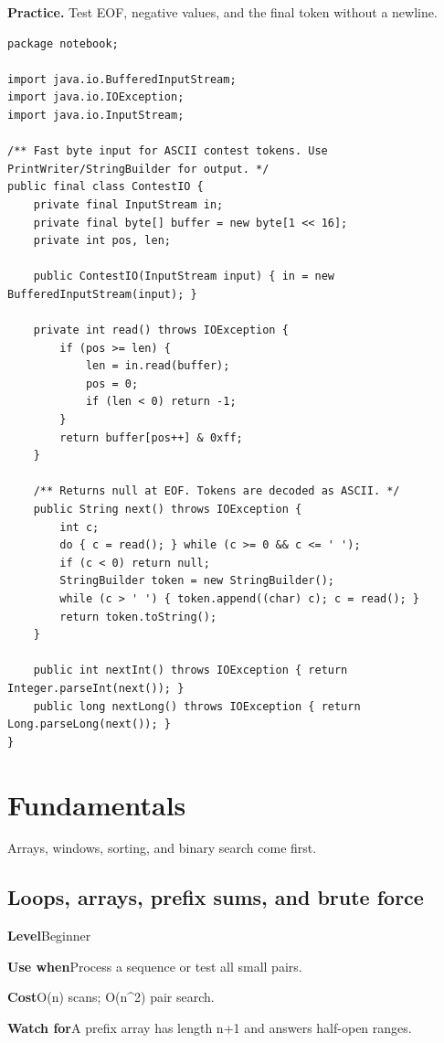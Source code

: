 \documentclass[10pt,letterpaper]{article}
\newcommand{\entrylabel}[1]{\textcolor{accent}{\bfseries #1}}
\begin{document}
\noindent\textbf{Practice.} Test EOF, negative values, and the final token without a newline.\par
\begin{lstlisting}
package notebook;

import java.io.BufferedInputStream;
import java.io.IOException;
import java.io.InputStream;

/** Fast byte input for ASCII contest tokens. Use PrintWriter/StringBuilder for output. */
public final class ContestIO {
    private final InputStream in;
    private final byte[] buffer = new byte[1 << 16];
    private int pos, len;

    public ContestIO(InputStream input) { in = new BufferedInputStream(input); }

    private int read() throws IOException {
        if (pos >= len) {
            len = in.read(buffer);
            pos = 0;
            if (len < 0) return -1;
        }
        return buffer[pos++] & 0xff;
    }

    /** Returns null at EOF. Tokens are decoded as ASCII. */
    public String next() throws IOException {
        int c;
        do { c = read(); } while (c >= 0 && c <= ' ');
        if (c < 0) return null;
        StringBuilder token = new StringBuilder();
        while (c > ' ') { token.append((char) c); c = read(); }
        return token.toString();
    }

    public int nextInt() throws IOException { return Integer.parseInt(next()); }
    public long nextLong() throws IOException { return Long.parseLong(next()); }
}
\end{lstlisting}
\section{Fundamentals}
\begin{guidebox}Arrays, windows, sorting, and binary search come first.\end{guidebox}
\subsection{Loops, arrays, prefix sums, and brute force}
\begin{guidebox}\small
\entrylabel{Level}\quad Beginner\par
\entrylabel{Use when}\quad Process a sequence or test all small pairs.\par
\entrylabel{Cost}\quad O(n) scans; O(n\textasciicircum{}2) pair search.\par
\entrylabel{Watch for}\quad A prefix array has length n+1 and answers half-open ranges.\par
\end{guidebox}
\end{document}
